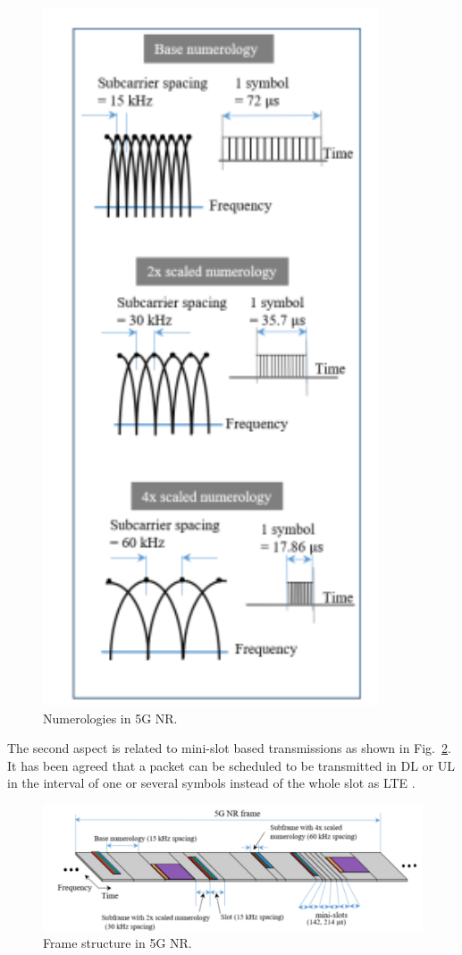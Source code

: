 \documentclass{report}
\begin{document}
\begin{figure}[htbp]
\centerline{\includegraphics[scale=0.35]{fig32.png}}
\caption{Numerologies in 5G NR.}
\label{fig32}
\end{figure}

The second aspect is related to mini-slot based transmissions as shown in Fig.~\ref{fig33}. It has been agreed that a packet can be scheduled to be transmitted in DL or UL in the interval of one or several symbols instead of the whole slot as LTE \cite{ad7}.

\begin{figure}[htbp]
\centerline{\includegraphics[scale=0.35]{fig33.png}}
\caption{Frame structure in 5G NR.}
\label{fig33}
\end{figure}
\end{document}
